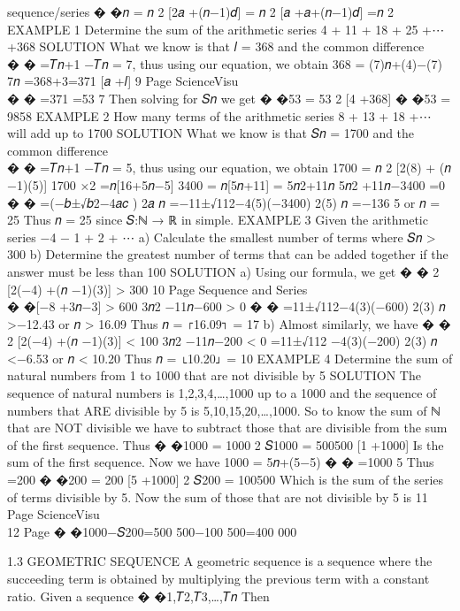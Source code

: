 \documentclass[
  letterpaper,
  DIV=11,
  numbers=noendperiod]{scrreprt}
\begin{document}
sequence/series � �𝑛 = 𝑛 2 {[}2𝑎 +(𝑛−1)𝑑{]} = 𝑛 2 {[}𝑎 +𝑎+(𝑛−1)𝑑{]} =𝑛 2
EXAMPLE 1 Determine the sum of the arithmetic series 4 + 11 + 18 + 25
+⋯+368 SOLUTION What we know is that 𝑙 = 368 and the common difference\\
� � =𝑇𝑛+1 −𝑇𝑛 = 7, thus using our equation, we obtain 368 = (7)𝑛+(4)−(7)
7𝑛 =368+3=371 {[}𝑎 +𝑙{]} 9 \textbar{} Page ScienceVisu\\
� � =371 =53 7 Then solving for 𝑆𝑛 we get � �53 = 53 2 {[}4 +368{]} �
�53 = 9858 EXAMPLE 2 How many terms of the arithmetic series 8 + 13 + 18
+⋯ will add up to 1700 SOLUTION What we know is that 𝑆𝑛 = 1700 and the
common difference\\
� � =𝑇𝑛+1 −𝑇𝑛 = 5, thus using our equation, we obtain 1700 = 𝑛 2 {[}2(8)
+ (𝑛 −1)(5){]} 1700 ×2 =𝑛{[}16+5𝑛−5{]} 3400 = 𝑛{[}5𝑛+11{]} = 5𝑛2+11𝑛 5𝑛2
+11𝑛−3400 =0 � � =(−𝑏±√𝑏2−4𝑎𝑐 ) 2𝑎 𝑛 =−11±√112−4(5)(−3400) 2(5) 𝑛 =−136
5 or 𝑛 = 25 Thus 𝑛 = 25 since 𝑆:ℕ → ℝ in simple. EXAMPLE 3 Given the
arithmetic series −4 − 1 + 2 + ⋯ a) Calculate the smallest number of
terms where 𝑆𝑛 \textgreater{} 300 b) Determine the greatest number of
terms that can be added together if the answer must be less than 100
SOLUTION a) Using our formula, we get � � 2 {[}2(−4) +(𝑛 −1)(3){]}
\textgreater{} 300 10 \textbar{} Page Sequence and Series\\
� �{[}−8 +3𝑛−3{]} \textgreater{} 600 3𝑛2 −11𝑛−600 \textgreater{} 0 � �
=11±√112−4(3)(−600) 2(3) 𝑛 \textgreater−12.43 or 𝑛 \textgreater{} 16.09
Thus 𝑛 = ⌈16.09⌉ = 17 b) Almost similarly, we have � � 2 {[}2(−4) +(𝑛
−1)(3){]} \textless{} 100 3𝑛2 −11𝑛−200 \textless{} 0 =11±√112
−4(3)(−200) 2(3) 𝑛 \textless−6.53 or 𝑛 \textless{} 10.20 Thus 𝑛 =
⌊10.20⌋ = 10 EXAMPLE 4 Determine the sum of natural numbers from 1 to
1000 that are not divisible by 5 SOLUTION The sequence of natural
numbers is 1,2,3,4,\ldots,1000 up to a 1000 and the sequence of numbers
that ARE divisible by 5 is 5,10,15,20,\ldots,1000. So to know the sum of
ℕ that are NOT divisible we have to subtract those that are divisible
from the sum of the first sequence. Thus � �1000 = 1000 2 𝑆1000 = 500500
{[}1 +1000{]} Is the sum of the first sequence. Now we have 1000 =
5𝑛+(5−5) � � =1000 5 Thus\\
=200 � �200 = 200 {[}5 +1000{]} 2 𝑆200 = 100500 Which is the sum of the
series of terms divisible by 5. Now the sum of those that are not
divisible by 5 is 11 \textbar{} Page ScienceVisu\\
12 \textbar{} Page � �1000−𝑆200=500 500−100 500=400 000

1.3 GEOMETRIC SEQUENCE A geometric sequence is a sequence where the
succeeding term is obtained by multiplying the previous term with a
constant ratio. Given a sequence � �1,𝑇2,𝑇3,\ldots,𝑇𝑛 Then
\end{document}
